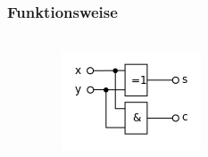 \begin{frame}
    \frametitle{Funktionsweise}
    \framesubtitle{}
    \begin{columns}[c]
            \begin{center}
            \end{center}
            \begin{figure}[H]
            \begin{center}
                    \includegraphics[scale=0.6]{./img/schaltung/halbadd_fun_00.png}
            \end{center}
            \end{figure}
    \end{columns}
\end{frame}


